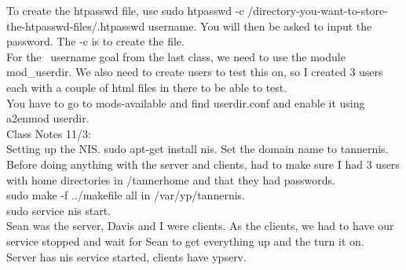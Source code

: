 \documentclass{article}
\begin{document}
To create the htpasswd file, use sudo htpasswd -c /directory-you-want-to-store-the-htpasswd-files/.htpasswd username. You will then be asked to input the password. The -c is to create the file.\\

For the ~username goal from the last class, we need to use the module mod\_userdir. We also need to create users to test this on, so I created 3 users each with a couple of html files in there to be able to test. \\
You have to go to mods-available and find userdir.conf and enable it using a2enmod userdir. \\
Class Notes 11/3:\\
Setting up the NIS. sudo apt-get install nis. Set the domain name to tannernis. \\
Before doing anything with the server and clients, had to make sure I had 3 users with home directories in /tannerhome and that they had passwords. \\
sudo make -f ../makefile all in /var/yp/tannernis. \\
sudo service nis start. \\
Sean was the server, Davis and I were clients. As the clients, we had to have our service stopped and wait for Sean to get everything up and the turn it on.\\
Server has nis service started, clients have ypserv. \\
\end{document}
